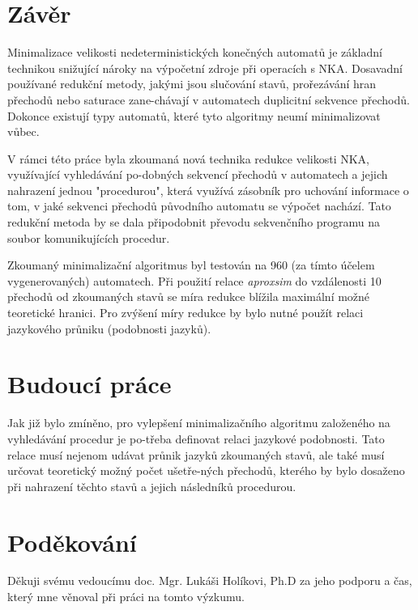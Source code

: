 \section{Závěr}
    Minimalizace velikosti nedeterministických konečných automatů je základní technikou snižující nároky na výpočetní zdroje při operacích s NKA. Dosavadní používané redukční metody, jakými jsou slučování stavů, prořezávání hran přechodů nebo saturace zane-chávají v automatech duplicitní sekvence přechodů. Dokonce existují typy automatů, které tyto algoritmy neumí minimalizovat vůbec.

    V rámci této práce byla zkoumaná nová technika redukce velikosti NKA, využívající vyhledávání po-dobných sekvencí přechodů v automatech a jejich nahrazení jednou "procedurou", která využívá zásobník pro uchování informace o tom, v jaké sekvenci přechodů původního automatu se výpočet nachází. Tato redukční metoda by se dala připodobnit převodu sekvenčního programu na soubor komunikujících procedur.

    Zkoumaný minimalizační algoritmus byl testován na 960 (za tímto účelem vygenerovaných) automatech. Při použití relace \textit{aproxsim} do vzdálenosti 10 přechodů od zkoumaných stavů se míra redukce blížila maximální možné teoretické hranici. Pro zvýšení míry redukce by bylo nutné použít relaci jazykového průniku (podobnosti jazyků).

\section{Budoucí práce}
    Jak již bylo zmíněno, pro vylepšení minimalizačního algoritmu založeného na vyhledávání procedur je po-třeba definovat relaci jazykové podobnosti. Tato relace musí nejenom udávat průnik jazyků zkoumaných stavů, ale také musí určovat teoretický možný počet ušetře-ných přechodů, kterého by bylo dosaženo při nahrazení těchto stavů a jejich následníků procedurou.

\section{Poděkování}
    Děkuji svému vedoucímu doc. Mgr. Lukáši Holíkovi, Ph.D za jeho podporu a čas, který mne věnoval při práci na tomto výzkumu.